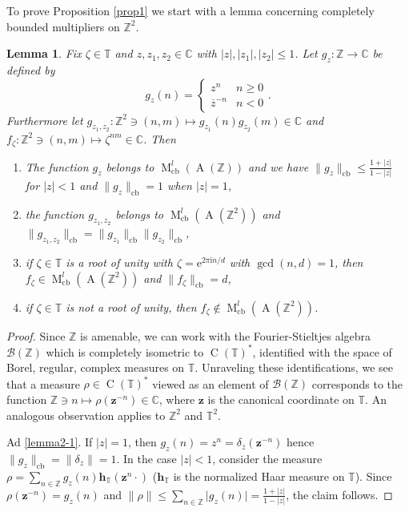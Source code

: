 \documentclass[12pt,reqno,a4paper]{amsart}
\newtheorem{lemma}[proposition]{Lemma}
\theoremstyle{definition}
\newcommand{\ee}{\mathrm{e}}
\newcommand{\ii}{\mathrm{i}}
\newcommand{\CC}{\mathbb{C}}
\newcommand{\TT}{\mathbb{T}}
\newcommand{\ZZ}{\mathbb{Z}}
\newcommand{\bh}{{\boldsymbol{h}}}
\newcommand{\bz}{{\boldsymbol{z}}}
\DeclareMathOperator{\A}{A}
\DeclareMathOperator{\C}{C}
\DeclareMathOperator{\M}{M}
\DeclareMathOperator{\cb}{cb}
\numberwithin{equation}{section}
\begin{document}
\begin{appendices}
To prove Proposition \ref{prop1} we start with a lemma concerning completely bounded multipliers on $\ZZ^2$.

\begin{lemma}\label{lemma2}
Fix $\zeta\in\TT$ and $z,z_1,z_2\in\CC$ with $|z|,|z_1|,|z_2|\le 1$. Let $g_z\colon\ZZ\to\CC$ be defined by
\[
g_z(n)=\begin{cases}
z^n&n\geq 0\\
\overline{z}^{-n}&n<0
\end{cases}.
\]
Furthermore let $g_{z_1,z_2}\colon\ZZ^2\ni(n,m)\mapsto g_{z_1}(n)g_{z_2}(m)\in\CC$ and $f_\zeta\colon\ZZ^2\ni(n,m)\mapsto\zeta^{nm}\in\CC$. Then
\begin{enumerate}
\item\label{lemma2-1} The function $g_z$ belongs to $\M^l_{\cb}(\A(\ZZ))$ and we have $\|g_z\|_{\cb}\le \tfrac{1+|z|}{1-|z|}$ for $|z|<1$ and $\|g_z\|_{\cb}=1$ when $|z|=1$,
\item\label{lemma2-2} the function $g_{z_1,z_2}$ belongs to $\M^l_{\cb}(\A(\ZZ^2))$ and $\|g_{z_1,z_2}\|_{\cb}=\|g_{z_1}\|_{\cb}\|g_{z_2}\|_{\cb}$,
\item\label{lemma2-3} if $\zeta\in\TT$ is a root of unity with $\zeta=\ee^{2\pi\ii n/d}$ with $\gcd(n,d)=1$, then $f_\zeta\in\M^l_{\cb}(\A(\ZZ^2))$ and $\|f_\zeta\|_{\cb}=d$,
\item\label{lemma2-4} if $\zeta\in\TT$ is not a root of unity, then $f_{\zeta}\not\in\M^l_{\cb}(\A(\ZZ^2))$.
\end{enumerate}
\end{lemma}

\begin{proof}
Since $\ZZ$ is amenable, we can work with the Fourier-Stieltjes algebra $\mathcal{B}(\ZZ)$ which is completely isometric to $\C(\TT)^*$, identified with the space of Borel, regular, complex measures on $\TT$. Unraveling these identifications, we see that a measure $\rho\in \C(\TT)^*$ viewed as an element of $\mathcal{B}(\ZZ)$ corresponds to the function $\ZZ\ni n\mapsto \rho(\bz^{-n})\in\CC$, where $\bz$ is the canonical coordinate on $\TT$. An analogous observation applies to $\ZZ^2$ and $\TT^2$.

Ad \eqref{lemma2-1}. If $|z|=1$, then $g_z(n)=z^n=\delta_{\overline{z}}(\bz^{-n})$ hence $\|g_z\|_{\cb}=\|\delta_z\|=1$. In the case $|z|<1$, consider the measure $\rho=\sum\limits_{n\in\ZZ} g_z(n)\bh_{\TT}(\bz^{n}\cdot)$ ($\bh_\TT$ is the normalized Haar measure on $\TT$). Since $\rho(\bz^{-n})=g_z(n)$ and $\|\rho\|\le\sum\limits_{n\in \ZZ}\bigl|g_z(n)\bigr|=\tfrac{1+|z|}{1-|z|}$, the claim follows.


\end{proof}
\end{appendices}
\end{document}
